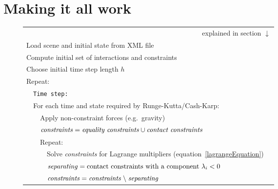 \section{Making it all work\label{implementation}}

\begin{figure}
\renewcommand{\baselinestretch}{1.3}\small\normalsize
\newcommand{\spx}{\vspace*{\baselineskip}\\}
\newcommand{\curly}[2]{\zerobox{b}{\mbox{$\left\}\:#1\begin{array}{l}#2\end{array}\right.$}}}
\begin{tabular}{|l|l|l|l|@{}l}
\multicolumn{5}{r}{explained in section $\downarrow$}\\\cline{1-4}
\multicolumn{4}{|l|}{Load scene and initial state from XML file}
&\curly{\ref{softwareTools}}{\spx}\hspace*{7mm}\\\cline{1-4}
\multicolumn{4}{|l|}{Compute initial set of interactions and constraints}&
\curly{\ref{meshIntersection}}{\spx}\\\cline{1-4}
\multicolumn{4}{|l|}{Choose initial time step length $h$}\\\cline{1-4}
\multicolumn{4}{|l|}{Repeat:}\\\cline{2-4}
    &\multicolumn{3}{|l|}{\texttt{Time step:}}\\\cline{2-4}
    &\multicolumn{3}{|l|}{For each time and state required by Runge-Kutta/Cash-Karp:}&
    \curly{\ref{solvingODEs}}{\spx}\\\cline{3-4}
        &&\multicolumn{2}{|l|}{Apply non-constraint forces (e.g.\ gravity)}\\\cline{3-4}
        &&\multicolumn{2}{|l|}{$\mbox{\textit{constraints}} = \mbox{\textit{equality constraints}}
        \cup \mbox{\textit{contact constraints}}$}\\\cline{3-4}
        &&\multicolumn{2}{|l|}{Repeat:}\\\cline{4-4}
            &&&Solve \textit{constraints} for Lagrange multipliers (equation~\ref{lagrangeEquation})\\\cline{4-4}
            &&&$\mbox{\textit{separating}} = \mbox{contact constraints with a component } \lambda_i < 0$&
            \curly{\ref{restingContact}}{\spx\spx\spx\spx\spx\spx\spx}\\\cline{4-4}
            &&&$\mbox{\textit{constraints}} = \mbox{\textit{constraints}} \;\backslash\;
            \mbox{\textit{separating}}$\\\cline{4-4}

\end{tabular}
\end{figure}
